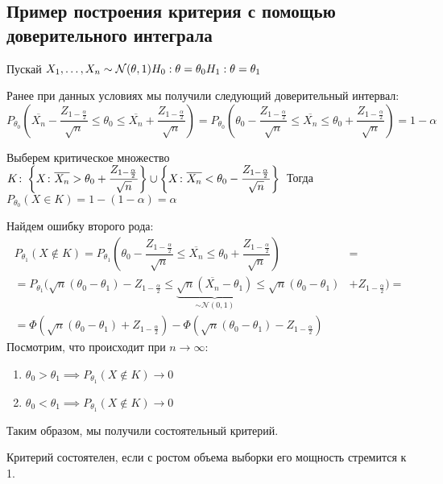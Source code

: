 \subsection{Пример построения критерия с помощью доверительного интеграла}
\begin{example}
Пускай $X_1,\ldots,X_n\sim\mathcal{N}(\theta,1)\\ H_0:\theta=\theta_0\\ H_1:\theta=\theta_1$

Ранее при данных условиях мы получили следующий доверительный интервал:
$$P_{\theta_0}\left(\overline{X_n}-\dfrac{Z_{1-\frac{\alpha}{2}}}{\sqrt{n}}\leq \theta_0\leq \overline{X_n}+\dfrac{Z_{1-\frac{\alpha}{2}}}{\sqrt{n}}\right)=P_{\theta_0}\left(\theta_0-\dfrac{Z_{1-\frac{\alpha}{2}}}{\sqrt{n}}\leq \overline{X_n}\leq \theta_0+\dfrac{Z_{1-\frac{\alpha}{2}}}{\sqrt{n}}\right)=1-\alpha$$

Выберем критическое множество $K\colon \left\{X\colon
\overline{X_n}>\theta_0+\dfrac{Z_{1-\frac{\alpha}{2}}}{\sqrt{n}}\right\}\cup\left\{X\colon \overline{X_n}<\theta_0-\dfrac{Z_{1-\frac{\alpha}{2}}}{\sqrt{n}}\right\}\\$
Тогда $P_{\theta_0}(X\in K)=1-(1-\alpha)=\alpha$

Найдем ошибку второго рода: 
        \begin{align}
            P_{\theta_1}(X\notin K)=P_{\theta_1}\left(\theta_0-\dfrac{Z_{1-\frac{\alpha}{2}}}{\sqrt{n}}\leq \overline{X_n}\leq \theta_0+\dfrac{Z_{1-\frac{\alpha}{2}}}{\sqrt{n}}\right)&=
        \\
        =P_{\theta_1}\Bigg(\sqrt{n}\left(\theta_0-\theta_1\right)-Z_{1-\frac{\alpha}{2}}\leq \underbrace{\sqrt{n}\left(\overline{X_n}-\theta_1\right)}_{\sim\mathcal{N}(0,1)}\leq \sqrt{n}\left(\theta_0-\theta_1\right)&+Z_{1-\frac{\alpha}{2}}\Bigg)=
        \\
        =\Phi\left(\sqrt{n}\left(\theta_0-\theta_1\right)+Z_{1-\frac{\alpha}{2}}\right)-\Phi\left(\sqrt{n}\left(\theta_0-\theta_1\right)-Z_{1-\frac{\alpha}{2}}\right)
        \end{align}
Посмотрим, что происходит при $n\rightarrow \infty$:
\begin{enumerate}
    \item $\theta_0>\theta_1\implies P_{\theta_1}(X\notin K)\rightarrow 0$
    \item $\theta_0<\theta_1\implies P_{\theta_1}(X\notin K)\rightarrow 0$
\end{enumerate}
Таким образом, мы получили состоятельный критерий.

\begin{definition*}
	Критерий состоятелен, если с ростом объема выборки его мощность стремится к 1.
\end{definition*}
\end{example}

